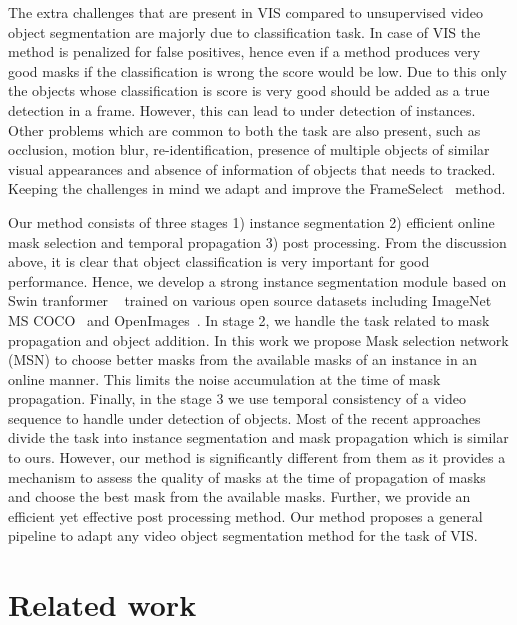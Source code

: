 \documentclass[final]{cvpr}
\begin{document}
The extra challenges that are present in VIS compared to unsupervised video object segmentation are majorly due to classification task. In case of VIS the method is penalized for false positives, hence even if a method produces very good masks if the classification is wrong the score would be low. Due to this only the objects whose classification is score is very good should be added as a true detection in a frame. However, this can lead to under detection of instances. Other problems which are common to both the task are also present, such as occlusion, motion blur, re-identification, presence of multiple objects of similar visual appearances and absence of information of objects that needs to tracked. Keeping the challenges in mind we adapt and improve the FrameSelect~\cite{garg2021mask} method.

Our method consists of three stages 1) instance segmentation 2)  efficient online mask selection and temporal propagation 3) post processing. From the discussion above, it is clear that object classification is very important for good performance. Hence, we develop a strong instance segmentation module based on Swin tranformer ~\cite{liu2021swin} trained on various open source datasets including
ImageNet~\cite{krizhevsky2012imagenet} MS COCO~\cite{lin2014microsoft} and OpenImages~\cite{kuznetsova2020open}. In stage 2, we handle the task related to mask propagation and object addition. In this work we propose Mask selection network (MSN) to choose better masks from the available masks of an instance in an online manner. This limits the noise accumulation at the time of mask propagation. Finally, in the stage 3 we use temporal consistency of a video sequence to handle under detection of objects.
Most of the recent approaches~\cite{lin2021video, gberta_2020_CVPR, luiten2019video} divide the task into instance segmentation and mask propagation which is similar to ours. However, our method is significantly different from them as it provides a mechanism to assess the quality of masks at the time of propagation of masks and choose the best mask from the available masks. Further, we provide an efficient yet effective post processing method.
Our method proposes a general pipeline to adapt any video object segmentation method for the task of VIS.



\section{Related work}
\end{document}
